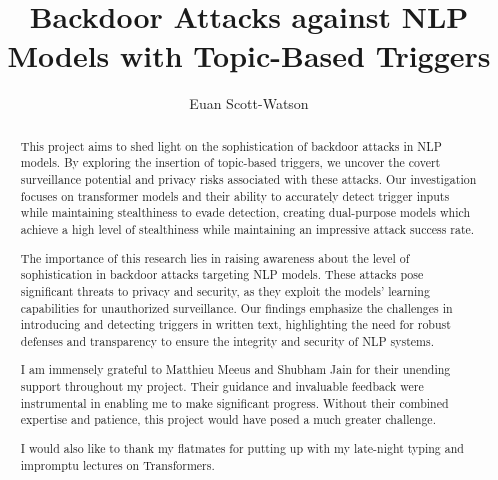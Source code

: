 \documentclass[a4paper, twoside]{report}
\title{Backdoor Attacks against NLP Models with Topic-Based Triggers}
\author{Euan Scott-Watson}
\begin{document}


\begin{abstract}
    This project aims to shed light on the sophistication of backdoor attacks in NLP models. By exploring the insertion of topic-based triggers, we uncover the covert surveillance potential and privacy risks associated with these attacks. Our investigation focuses on transformer models and their ability to accurately detect trigger inputs while maintaining stealthiness to evade detection, creating dual-purpose models which achieve a high level of stealthiness while maintaining an impressive attack success rate.

    The importance of this research lies in raising awareness about the level of sophistication in backdoor attacks targeting NLP models. These attacks pose significant threats to privacy and security, as they exploit the models' learning capabilities for unauthorized surveillance. Our findings emphasize the challenges in introducing and detecting triggers in written text, highlighting the need for robust defenses and transparency to ensure the integrity and security of NLP systems.
\end{abstract}

\renewcommand{\abstractname}{Acknowledgements}
\begin{abstract}
    I am immensely grateful to Matthieu Meeus and Shubham Jain for their unending support throughout my project. Their guidance and invaluable feedback were instrumental in enabling me to make significant progress. Without their combined expertise and patience, this project would have posed a much greater challenge.

    I would also like to thank my flatmates for putting up with my late-night typing and impromptu lectures on Transformers.
\end{abstract}

\tableofcontents













\end{document}
